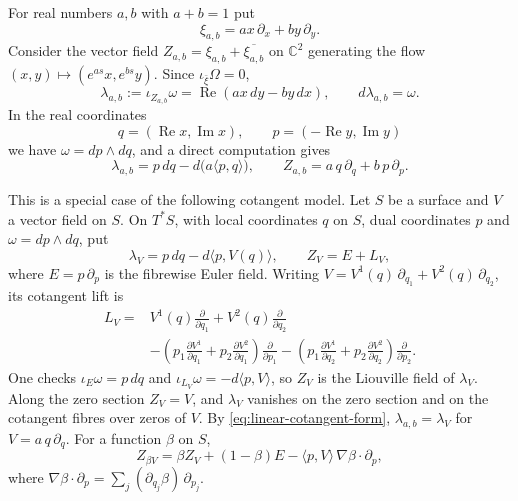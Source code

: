 \documentclass[a4paper]{amsart}
\newcommand{\C}{\mathbb{C}}
\DeclareMathOperator{\Ree}{Re}
\renewcommand{\Im}{\operatorname{Im}}
\numberwithin{equation}{section}
\begin{document}
For real numbers $a,b$ with $a+b=1$ put
\[
 \xi_{a,b}=ax\,\partial_x+by\,\partial_y .
\]
Consider the vector field $Z_{a,b}=\xi_{a,b}+\overline{\xi_{a,b}}$
on $\C^2$ generating the flow $(x,y)\mapsto(e^{as}x,e^{bs}y)$. Since
$\iota_{\bar\xi}\Omega=0$,
\begin{equation}\label{eq:linear-liouville}
 \lambda_{a,b}:=\iota_{Z_{a,b}}\omega=\Ree(ax\,dy-by\,dx),
 \qquad d\lambda_{a,b}=\omega .
\end{equation}
In the real coordinates
\begin{equation}\label{eq:real-cotangent-coordinates}
 q=(\Ree x,\Im x),\qquad p=(-\Ree y,\Im y)
\end{equation}
we have $\omega=dp\wedge dq$, and a direct computation gives
\begin{equation}\label{eq:linear-cotangent-form}
 \lambda_{a,b}=p\,dq-d\bigl(a\langle p,q\rangle\bigr),
 \qquad Z_{a,b}=a\,q\,\partial_q+b\,p\,\partial_p .
\end{equation}

This is a special case of the following cotangent model. Let $S$ be a
surface and $V$ a vector field on $S$. On $T^*S$, with local coordinates
$q$ on $S$, dual coordinates $p$ and $\omega=dp\wedge dq$, put
\[
 \lambda_V=p\,dq-d\langle p,V(q)\rangle,\qquad
 Z_V=E+L_V,
\]
where $E=p\,\partial_p$ is the fibrewise Euler field. Writing
$V=V^1(q)\,\partial_{q_1}+V^2(q)\,\partial_{q_2}$, its cotangent lift is
\[
 \begin{aligned}
 L_V={}&V^1(q)\frac{\partial}{\partial q_1}
       +V^2(q)\frac{\partial}{\partial q_2}\\
 &-\left(p_1\frac{\partial V^1}{\partial q_1}
         +p_2\frac{\partial V^2}{\partial q_1}\right)
         \frac{\partial}{\partial p_1}
  -\left(p_1\frac{\partial V^1}{\partial q_2}
         +p_2\frac{\partial V^2}{\partial q_2}\right)
         \frac{\partial}{\partial p_2}.
 \end{aligned}
\]
One checks $\iota_E\omega=p\,dq$ and
$\iota_{L_V}\omega=-d\langle p,V\rangle$, so $Z_V$ is the Liouville
field of $\lambda_V$. Along the zero section $Z_V=V$, and $\lambda_V$
vanishes on the zero section and on the cotangent fibres over zeros of
$V$. By \eqref{eq:linear-cotangent-form},
$\lambda_{a,b}=\lambda_V$ for $V=a\,q\,\partial_q$. For a function
$\beta$ on $S$,
\begin{equation}\label{eq:cutoff-liouville}
 Z_{\beta V}=\beta Z_V+(1-\beta)E-\langle p,V\rangle\,
 \nabla\beta\cdot\partial_p ,
\end{equation}
where $\nabla\beta\cdot\partial_p=\sum_j(\partial_{q_j}\beta)\,
\partial_{p_j}$.
\end{document}
